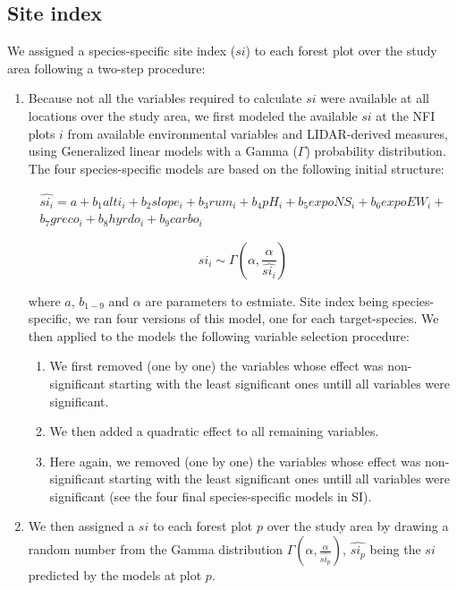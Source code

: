 \documentclass[a4paper]{article}
\begin{document}

\subsection*{Site index}

\noindent We assigned a species-specific site index ($si$) to each forest plot over the study area following a two-step procedure:

\begin{enumerate}
    \item Because not all the variables required to calculate $si$ were available at all locations over the study area, we first modeled the available $si$ at the NFI plots $i$ from available environmental variables and LIDAR-derived measures, using Generalized linear models with a Gamma ($\Gamma$) probability distribution. The four species-specific models are based on the following initial structure:

    \begin{multline}\label{si}
      \widehat{si_i} = a + b_1 alti_i + b_2 slope_i + b_3 rum_i + b_4 pH_i + b_5 expoNS_i + b_6 expoEW_i + \\ b_7 greco_i + b_8 hyrdo_i + b_9 carbo_i
    \end{multline}

    \begin{equation}\label{siGamma}
      si_i \sim \Gamma(\alpha, \frac{\alpha}{\widehat{si_i}})
    \end{equation}

    where $a$, $b_{1-9}$ and $\alpha$ are parameters to estmiate. Site index being species-specific, we ran four versions of this model, one for each target-species. We then applied to the models the following variable selection procedure:

    \begin{enumerate}

        \item We first removed (one by one) the variables whose effect was non-significant starting with the least significant ones untill all variables were significant.

        \item We then added a quadratic effect to all remaining variables.

        \item Here again, we removed (one by one) the variables whose effect was non-significant starting with the least significant ones untill all variables were significant (see the four final species-specific models in SI).

  \end{enumerate}

    \item We then assigned a $si$ to each forest plot $p$ over the study area by drawing a random number from the Gamma distribution $\Gamma(\alpha, \frac{\alpha}{\widehat{si_p}})$, $\widehat{si_p}$ being the $si$ predicted by the models at plot $p$.

\end{enumerate}
\end{document}

